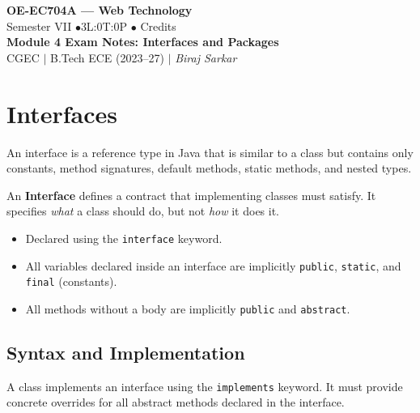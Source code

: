 \documentclass[12pt,a4paper]{article}
\begin{document}

\begin{center}
  {\LARGE\bfseries\color{myred} OE-EC704A --- Web Technology}\\[5pt]
  {\normalsize\color{mydark} Semester VII \quad$\bullet$\quad 3L:0T:0P \quad$\bullet$ Credits}\\[3pt]
  {\normalsize\color{myteal}\textbf{Module 4 Exam Notes: Interfaces and Packages}}\\[3pt]
  {\small\color{mydark} CGEC \;$|$\; B.Tech ECE (2023--27) \;$|$\; \textit{Biraj Sarkar}}
\end{center}
\noindent{\color{myred}\rule{\linewidth}{1.5pt}}
\vspace{2pt}

\hypersetup{linkcolor=mydark}
\tableofcontents
\hypersetup{linkcolor=myteal}
\newpage

\section{Interfaces}

An interface is a reference type in Java that is similar to a class but contains only constants, method signatures, default methods, static methods, and nested types.

\begin{tcolorbox}[defbox, title={\textbf{Interface Concept}}]
An \textbf{Interface} defines a contract that implementing classes must satisfy. It specifies \textit{what} a class should do, but not \textit{how} it does it.
\begin{itemize}[leftmargin=*, itemsep=3pt]
  \item Declared using the \texttt{interface} keyword.
  \item All variables declared inside an interface are implicitly \texttt{public}, \texttt{static}, and \texttt{final} (constants).
  \item All methods without a body are implicitly \texttt{public} and \texttt{abstract}.
\end{itemize}
\end{tcolorbox}

\subsection{Syntax and Implementation}
A class implements an interface using the \texttt{implements} keyword. It must provide concrete overrides for all abstract methods declared in the interface.
\end{document}
